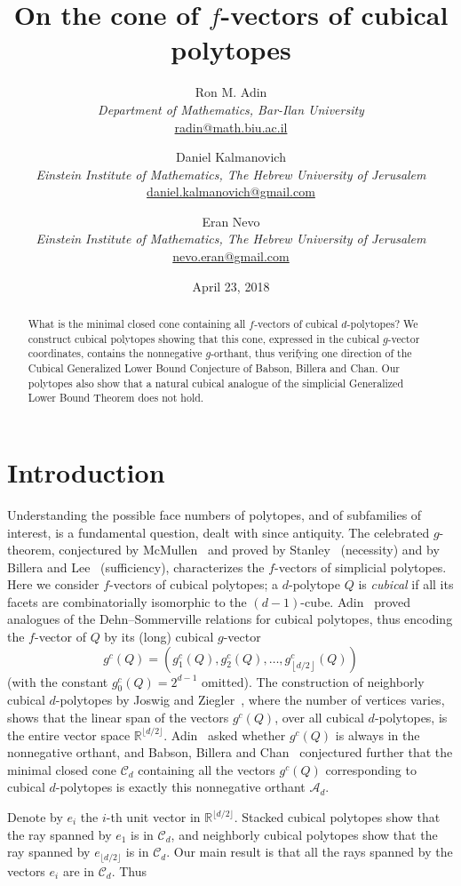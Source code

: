 \documentclass[a4paper,leqno]{article}
\title{On the cone of $f$-vectors of cubical polytopes}
\author{Ron M. Adin\\
{\it Department of Mathematics, Bar-Ilan University}\\
\url{radin@math.biu.ac.il}
\and Daniel Kalmanovich\\
{\it Einstein Institute of Mathematics, The Hebrew University of Jerusalem}\\
\url{daniel.kalmanovich@gmail.com}
\and Eran Nevo\\
{\it Einstein Institute of Mathematics, The Hebrew University of Jerusalem}\\
\url{nevo.eran@gmail.com}
}
\date{April 23, 2018}
\theoremstyle{definition}
\newcommand{\dhalf}[1]{\left\lfloor #1/2\right\rfloor}
\begin{document}
\maketitle

\begin{abstract}
	What is the minimal closed cone containing all $f$-vectors of cubical $d$-polytopes?
	We construct cubical polytopes showing that this cone, expressed in the cubical $g$-vector coordinates, contains the nonnegative $g$-orthant,
	thus verifying one direction of the Cubical Generalized Lower Bound Conjecture of Babson, Billera and Chan. Our polytopes also show that a natural cubical analogue of the simplicial Generalized Lower Bound Theorem does not hold.
\end{abstract}

\section{Introduction}
Understanding the possible face numbers of polytopes, and of subfamilies of interest, is a fundamental question, dealt with since antiquity.
The celebrated $g$-theorem, conjectured by McMullen~\cite{McMu71} and proved by Stanley~\cite{Stan80} (necessity) and by Billera and Lee~\cite{BillL81} (sufficiency), characterizes the $f$-vectors of simplicial polytopes.
Here we consider $f$-vectors of cubical polytopes;
a $d$-polytope $Q$ is \emph{cubical} if all its facets are combinatorially isomorphic to the $(d-1)$-cube.
Adin~\cite{Adin96} proved analogues of the Dehn--Sommerville relations for cubical polytopes,
thus encoding the $f$-vector of $Q$ by its (long) cubical $g$-vector
\[g^c(Q)=\left(g_1^c(Q), g_2^c(Q), \dots, g_{\dhalf{d}}^c(Q)\right)\]
(with the constant $g_0^c(Q)=2^{d-1}$ omitted).
The construction of neighborly cubical $d$-polytopes by Joswig and Ziegler~\cite{JoswZ00}, where the number of vertices varies, shows that the linear span of the vectors $g^c(Q)$, over all cubical $d$-polytopes, is the entire vector space $\mathbb{R}^{\lfloor d/2\rfloor}$.
Adin~\cite[Question 2]{Adin96} asked whether $g^c(Q)$ is always in the nonnegative orthant, and Babson, Billera and Chan~\cite[Conjecture 5.2]{BabsBC97} conjectured further that the minimal closed cone $\mathcal{C}_d$ containing all the vectors $g^c(Q)$ corresponding to cubical $d$-polytopes is exactly this nonnegative orthant $\mathcal{A}_d$.

Denote by $e_i$ the $i$-th unit vector in $\mathbb{R}^{\lfloor d/2\rfloor}$. Stacked cubical polytopes show that the ray spanned by $e_1$ is in $\mathcal{C}_d$, and neighborly cubical polytopes show that the ray spanned by $e_{\lfloor d/2\rfloor}$ is in $\mathcal{C}_d$.
Our main result is that all the rays spanned by the vectors $e_i$ are in $\mathcal{C}_d$. Thus
\end{document}

